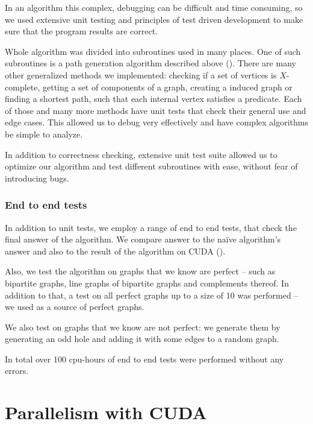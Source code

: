 In an algorithm this complex, debugging can be difficult and time consuming, so we used extensive unit testing and principles of test driven development to make sure that the program results are correct.

Whole algorithm was divided into subroutines used in many places. One of such subroutines is a path generation algorithm described above (). There are many other generalized methods we implemented: checking if a set of vertices is $X$-complete, getting a set of components of a graph, creating a induced graph or finding a shortest path, such that each internal vertex satisfies a predicate. Each of those and many more methods have unit tests that check their general use and edge cases. This allowed us to debug very effectively and have complex algorithms be simple to analyze.

In addition to correctness checking, extensive unit test suite allowed us to optimize our algorithm and test different subroutines with ease, without fear of introducing bugs.

\subsubsection{End to end tests}

In addition to unit tests, we employ a range of end to end tests, that check the final answer of the algorithm. We compare answer to the na\"ive algorithm's answer and also to the result of the algorithm on CUDA ().

Also, we test the algorithm on graphs that we know are perfect -- such as bipartite graphs, line graphs of bipartite graphs and complements thereof. In addition to that, a test on all perfect graphs up to a size of 10 was performed -- we used \cite{graphRepo} as a source of perfect graphs.

We also test on graphs that we know are not perfect: we generate them by generating an odd hole and adding it with some edges to a random graph.

In total over 100 cpu-hours of end to end tests were performed without any errors.

\section{Parallelism with CUDA}
\label{sec:CUDA}

